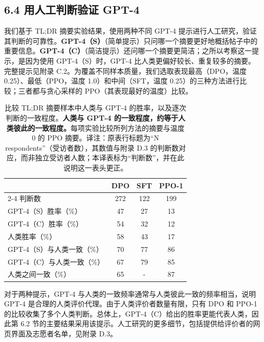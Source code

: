 \subsection*{6.4 用人工判断验证 GPT-4}
我们基于 TL;DR 摘要实验结果，使用两种不同 GPT-4 提示进行人工研究，验证其判断的可靠性。\textbf{GPT-4（S）}（简单提示）只问哪一个摘要更好地概括帖子中的重要信息。\textbf{GPT-4（C）}（简洁提示）还问哪一个摘要更简洁；之所以考察这一提示，是因为使用 GPT-4（S）时，GPT-4 比人类更偏好较长、重复较多的摘要。完整提示见附录 C.2。为覆盖不同样本质量，我们选取表现最高（DPO，温度 0.25）、最低（PPO，温度 1.0）和中间（SFT，温度 0.25）的三种方法进行比较；三者都与贪心采样的 PPO（其表现最好的温度）比较。
\begingroup\setlength{\LTcapwidth}{.97\linewidth}
\begin{longtable}{lccc}
\caption{比较 TL;DR 摘要样本中人类与 GPT-4 的胜率，以及逐次判断的一致程度。\textbf{人类与 GPT-4 的一致程度，约等于人类彼此的一致程度。}每项实验比较所列方法的摘要与温度 0 的 PPO 摘要。译注：原表行标题为“N respondents”（受访者数），其数值与附录 D.3 的判断数对应，而非独立受访者人数；本译表标为“判断数”，并在此说明这一表头更正。}\label{dpo-tab:human_results}\\

    \toprule
        & \textbf{DPO} & \textbf{SFT} & \textbf{PPO-1} \\
        \cmidrule(lr){2-4}
        判断数 & 272 & 122 & 199 \\
        \midrule
        GPT-4（S）胜率（\%） & 47 & 27 & 13 \\
        GPT-4（C）胜率（\%） & 54 & 32 & 12 \\
        人类胜率（\%） & 58 & 43 & 17 \\
        \midrule
        GPT-4（S）与人类一致（\%） & 70 & 77 & 86 \\
        GPT-4（C）与人类一致（\%） & 67 & 79 & 85 \\
        人类之间一致（\%） & 65 & - & 87 \\
        \bottomrule
    
\end{longtable}
\endgroup
对于两种提示，GPT-4 与人类的一致频率通常与人类彼此一致的频率相当，说明 GPT-4 是合理的人类评价代理。由于人类评价者数量有限，只有 DPO 和 PPO-1 的比较收集了多个人类判断。总体上，GPT-4（C）给出的胜率更能代表人类，因此第 6.2 节的主要结果采用该提示。人工研究的更多细节，包括提供给评价者的网页界面及志愿者名单，见附录 D.3。













